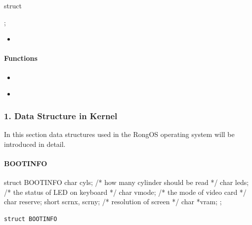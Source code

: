 \documentclass{swfcthesis}
\begin{document}
\begin{codeblock}[1]
\begin{ccode}
struct 
{ 
  
};
\end{ccode}
\end{codeblock}
\begin{itemize}
\item 
\end{itemize}

\paragraph{ Functions}

\begin{ccode}

\end{ccode}
\begin{itemize}
\item 
\end{itemize}

\begin{ccode}

\end{ccode}
\begin{itemize}
\item 
\end{itemize}


\iffalse %
\subsubsection{1. Data Structure in Kernel}
In this section data structures used in the RongOS operating system will be introduced in
detail.

\paragraph{BOOTINFO}

\begin{listing}[H]
  \begin{codeblock}
\begin{ccode}
struct BOOTINFO
{
  char cyls;          /* how many cylinder should be read */
  char leds;          /* the status of LED on keyboard */
  char vmode;         /* the mode of video card */
  char reserve;
  short scrnx, scrny; /* resolution of screen */
  char *vram;
};
\end{ccode}
  \end{codeblock}
  \caption{\texttt{struct BOOTINFO}}\label{src:bootinfo}
\end{listing}
\end{document}
